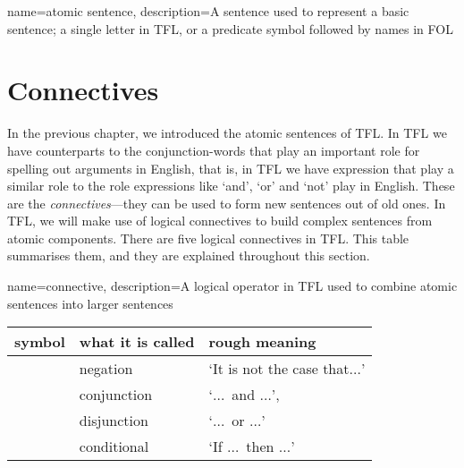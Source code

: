 {
name=atomic sentence,
description={A sentence used to represent a basic sentence; a single letter in TFL, or a predicate symbol followed by names in FOL}
}

\section{Connectives}
\label{s:TFLConnectives}

In the previous chapter, we introduced the atomic sentences of TFL.  In TFL we have counterparts to the conjunction-words that play an important role for spelling out arguments in English, that is, in TFL we have expression that play a similar role to the role expressions like `and', `or' and `not' play in English. These are the \emph{connectives}---they can be used to form new sentences out of old ones. In TFL, we will make use of logical connectives to build complex sentences from atomic components. There are five logical connectives in TFL. This table summarises them, and they are explained throughout this section.

{
name=connective,
description={A logical operator in TFL used to combine \glspl{atomic sentence} into larger sentences}
}
	\begin{table}[h]
	\center
	\begin{tabular}{l l l}

	\textbf{symbol}&\textbf{what it is called}&\textbf{rough meaning}\\
	\hline
	\enot&negation&`It is not the case that$\ldots$'\\
	\eand&conjunction&`$\ldots$\ and $\ldots$',\\
	\eor&disjunction&`$\ldots$\ or $\ldots$'\\
	\eif&conditional&`If $\ldots$\ then $\ldots$'\\

	\end{tabular}
	\end{table}


